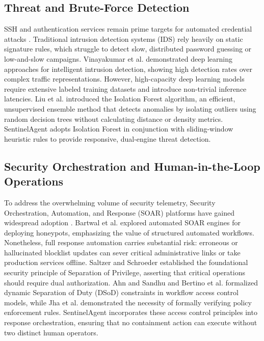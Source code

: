 \documentclass[conference]{IEEEtran}
\begin{document}
\subsection{Threat and Brute-Force Detection}
SSH and authentication services remain prime targets for automated credential attacks \cite{najafabadi2015detection}. Traditional intrusion detection systems (IDS) rely heavily on static signature rules, which struggle to detect slow, distributed password guessing or low-and-slow campaigns. Vinayakumar et al. \cite{vinayakumar2019deep} demonstrated deep learning approaches for intelligent intrusion detection, showing high detection rates over complex traffic representations. However, high-capacity deep learning models require extensive labeled training datasets and introduce non-trivial inference latencies. Liu et al. \cite{liu2008isolation} introduced the Isolation Forest algorithm, an efficient, unsupervised ensemble method that detects anomalies by isolating outliers using random decision trees without calculating distance or density metrics. SentinelAgent adopts Isolation Forest in conjunction with sliding-window heuristic rules to provide responsive, dual-engine threat detection.

\subsection{Security Orchestration and Human-in-the-Loop Operations}
To address the overwhelming volume of security telemetry, Security Orchestration, Automation, and Response (SOAR) platforms have gained widespread adoption \cite{islam2019multivocal}. Bartwal et al. \cite{bartwal2022security} explored automated SOAR engines for deploying honeypots, emphasizing the value of structured automated workflows. Nonetheless, full response automation carries substantial risk: erroneous or hallucinated blocklist updates can sever critical administrative links or take production services offline. Saltzer and Schroeder \cite{saltzer1975protection} established the foundational security principle of Separation of Privilege, asserting that critical operations should require dual authorization. Ahn and Sandhu \cite{ahn2000role} and Bertino et al. \cite{bertino1999specification} formalized dynamic Separation of Duty (DSoD) constraints in workflow access control models, while Jha et al. \cite{jha2008towards} demonstrated the necessity of formally verifying policy enforcement rules. SentinelAgent incorporates these access control principles into response orchestration, ensuring that no containment action can execute without two distinct human operators.
\end{document}
